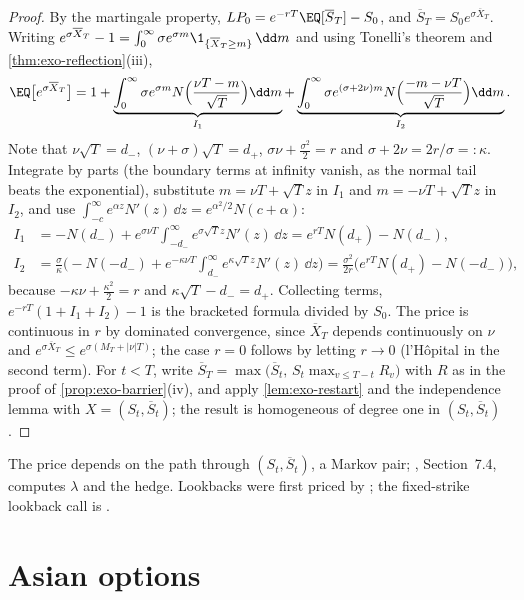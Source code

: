 \begin{proof}
By the martingale property, $LP_0=e^{-rT}\EQ[\overline S_T]-S_0$, and
$\overline S_T=S_0e^{\sigma\overline X_T}$. Writing $e^{\sigma\overline X_T}-1=\int_0^\infty\sigma
e^{\sigma m}\1_{\{\overline X_T\ge m\}}\,\dd m$ and using Tonelli's theorem and
\cref{thm:exo-reflection}(iii),
\[
  \EQ\big[e^{\sigma\overline X_T}\big]=1+\underbrace{\int_0^\infty\sigma e^{\sigma m}N\Big(\frac{\nu T-m}{\sqrt T}\Big)\dd m}_{I_1}
  +\underbrace{\int_0^\infty\sigma e^{(\sigma+2\nu)m}N\Big(\frac{-m-\nu T}{\sqrt T}\Big)\dd m}_{I_2}.
\]
Note that $\nu\sqrt T=d_-$, $(\nu+\sigma)\sqrt T=d_+$, $\sigma\nu+\frac{\sigma^2}2=r$ and
$\sigma+2\nu=2r/\sigma=:\kappa$. Integrate by parts (the boundary terms at infinity vanish, as the normal
tail beats the exponential), substitute $m=\nu T+\sqrt Tz$ in $I_1$ and $m=-\nu T+\sqrt Tz$ in $I_2$, and
use $\int_{-c}^\infty e^{\alpha z}N'(z)\,\dd z=e^{\alpha^2/2}N(c+\alpha)$:
\begin{align*}
  I_1&=-N(d_-)+e^{\sigma\nu T}\int_{-d_-}^\infty e^{\sigma\sqrt Tz}N'(z)\,\dd z=e^{rT}N(d_+)-N(d_-),\\
  I_2&=\frac\sigma\kappa\Big(-N(-d_-)+e^{-\kappa\nu T}\int_{d_-}^\infty e^{\kappa\sqrt Tz}N'(z)\,\dd z\Big)
  =\frac{\sigma^2}{2r}\Big(e^{rT}N(d_+)-N(-d_-)\Big),
\end{align*}
because $-\kappa\nu+\frac{\kappa^2}2=r$ and $\kappa\sqrt T-d_-=d_+$. Collecting terms,
$e^{-rT}(1+I_1+I_2)-1$ is the bracketed formula divided by $S_0$. The price is continuous in $r$ by
dominated convergence, since $\overline X_T$ depends continuously on $\nu$ and
$e^{\sigma\overline X_T}\le e^{\sigma(M_T+|\nu|T)}$; the case $r=0$ follows by letting $r\to0$
(l'H\^opital in the second term). For $t<T$, write
$\overline S_T=\max\big(\overline S_t,\,S_t\max_{v\le T-t}R_v\big)$ with $R$ as in the proof of
\cref{prop:exo-barrier}(iv), and apply \cref{lem:exo-restart} and the independence lemma with
$X=(S_t,\overline S_t)$; the result is homogeneous of degree one in $(S_t,\overline S_t)$.
\end{proof}

The price depends on the path through $(S_t,\overline S_t)$, a Markov pair; \textcite{shreve2},
Section~7.4, computes $\lambda$ and the hedge. Lookbacks were first priced by
\textcite{goldman-sosin-gatto-1979}; the fixed-strike lookback call is .

\section{Asian options}\label{sec:exo-asian}

